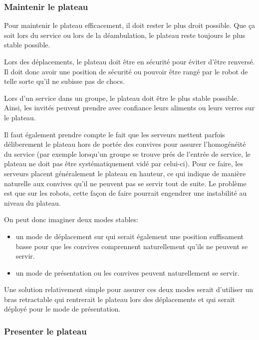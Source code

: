 \subsubsection{Maintenir le plateau}

Pour maintenir le plateau efficacement, il doit rester le plus droit
possible. Que ça soit lors du service ou lors de la déambulation, le
plateau reste toujours le plus stable possible.

Lors des déplacements, le plateau doit être en sécurité pour éviter
d’être renversé. Il doit donc avoir une position de sécurité ou
pouvoir être rangé par le robot de telle sorte qu’il ne subisse pas de
chocs.

Lors d’un service dans un groupe, le plateau doit être le plus stable
possible. Ainsi, les invités peuvent prendre avec confiance leurs
aliments ou leurs verres sur le plateau.

Il faut également prendre compte le fait que les serveurs mettent
parfois déliberement le plateau hors de portée des convives pour
assurer l'homogénéité du service (par exemple lorsqu'un groupe se
trouve prés de l'entrée de service, le plateau ne doit pas être
systématiquement vidé par celui-ci). Pour ce faire, les serveurs
placent généralement le plateau en hauteur, ce qui indique de manière
naturelle aux convives qu'il ne peuvent pas se servir tout de suite.
Le problème est que sur les robots, cette façon de faire pourrait
engendrer une instabilité au niveau du plateau.

On peut donc imaginer deux modes stables:
\begin{itemize}
\item un mode de déplacement sur qui serait également une position
  suffisament basse pour que les convives comprennent naturellement
  qu'ils ne peuvent se servir.
\item un mode de présentation ou les convives peuvent naturellement se
  servir.
\end{itemize} 

Une solution relativement simple pour assurer ces deux modes serait
d'utiliser un bras retractable qui rentrerait le plateau lors des
déplacements et qui serait déployé pour le mode de présentation.



\subsubsection{Presenter le plateau}

